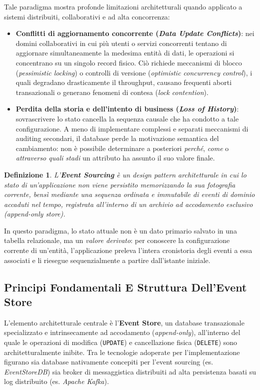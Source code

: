 \documentclass[11pt, a4paper]{article}
\newtheorem{theorem}{Definizione}
\begin{document}
Tale paradigma mostra profonde limitazioni architetturali quando applicato a sistemi distribuiti, collaborativi e ad alta concorrenza:
\begin{itemize}
    \item \textbf{Conflitti di aggiornamento concorrente (\emph{Data Update Conflicts})}: nei domini collaborativi in cui più utenti o servizi concorrenti tentano di aggiornare simultaneamente la medesima entità di dati, le operazioni si concentrano su un singolo record fisico. Ciò richiede meccanismi di blocco (\emph{pessimistic locking}) o controlli di versione (\emph{optimistic concurrency control}), i quali degradano drasticamente il throughput, causano frequenti aborti transazionali o generano fenomeni di contesa (\emph{lock contention}).
    \item \textbf{Perdita della storia e dell'intento di business (\emph{Loss of History})}: sovrascrivere lo stato cancella la sequenza causale che ha condotto a tale configurazione. A meno di implementare complessi e separati meccanismi di auditing secondari, il database perde la motivazione semantica del cambiamento: non è possibile determinare a posteriori \emph{perché}, \emph{come} o \emph{attraverso quali stadi} un attributo ha assunto il suo valore finale.
\end{itemize}

\begin{theorem}
L'\textbf{Event Sourcing} è un design pattern architetturale in cui lo stato di un'applicazione non viene persistito memorizzando la sua fotografia corrente, bensì mediante una sequenza ordinata e immutabile di eventi di dominio accaduti nel tempo, registrata all'interno di un archivio ad accodamento esclusivo (\emph{append-only store}).
\end{theorem}

In questo paradigma, lo stato attuale non è un dato primario salvato in una tabella relazionale, ma un \emph{valore derivato}: per conoscere la configurazione corrente di un'entità, l'applicazione preleva l'intera cronistoria degli eventi a essa associati e li riesegue sequenzialmente a partire dall'istante iniziale.

\subsection{Principi Fondamentali E Struttura Dell'Event Store}

L'elemento architetturale centrale è l'\textbf{Event Store}, un database transazionale specializzato e intrinsecamente ad accodamento (\emph{append-only}), all'interno del quale le operazioni di modifica (\texttt{UPDATE}) e cancellazione fisica (\texttt{DELETE}) sono architetturalmente inibite. Tra le tecnologie adoperate per l'implementazione figurano sia database nativamente concepiti per l'event sourcing (es. \emph{EventStoreDB}) sia broker di messaggistica distribuiti ad alta persistenza basati su log distribuito (es. \emph{Apache Kafka}).
\end{document}
